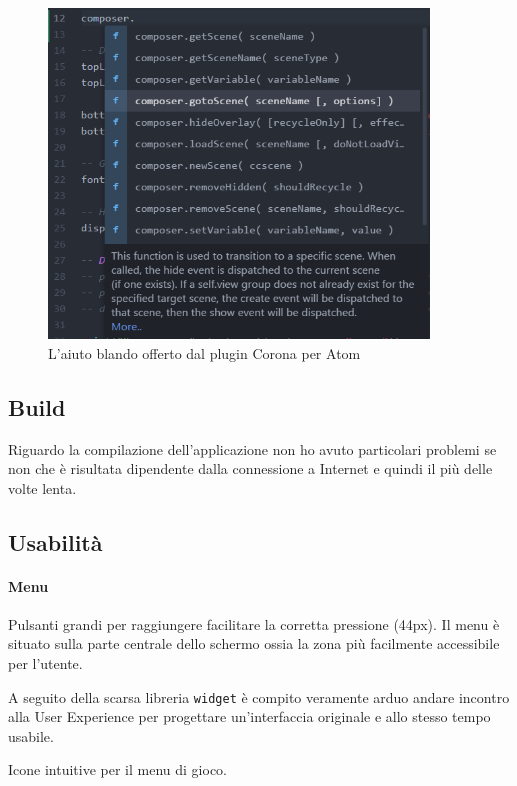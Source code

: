			\begin{figure}
				\centering
				\includegraphics[width=0.9\textwidth]{img/atomPlugin}
				\caption{L'aiuto blando offerto dal plugin Corona per Atom}
				\label{fig:atomPlugin}
			\end{figure}
		
		\subsection{Build}
			Riguardo la compilazione dell'applicazione non ho avuto particolari problemi se non che è risultata dipendente dalla connessione a Internet e quindi il più delle volte lenta. 
	
	
	\subsection{Usabilità}
	
		\paragraph{Menu}
		
		Pulsanti grandi per raggiungere facilitare la corretta pressione (44px).
		Il menu è situato sulla parte centrale dello schermo ossia la zona più facilmente accessibile per l'utente.
		
		A seguito della scarsa libreria \verb|widget| è compito veramente arduo andare incontro alla User Experience per progettare un'interfaccia originale e allo stesso tempo usabile. 
		
		Icone intuitive per il menu di gioco.
		
